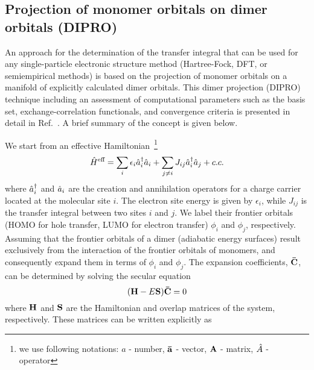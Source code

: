 \subsection{Projection of monomer orbitals on dimer orbitals (DIPRO)}
\label{sec:dipro}
An approach for the determination of the transfer integral that can be used for any single-particle electronic structure method (Hartree-Fock, DFT, or semiempirical methods) is based on the projection of monomer orbitals on a manifold of explicitly calculated dimer orbitals. This dimer projection (DIPRO) technique including an assessment of computational parameters such as the basis set, exchange-correlation functionals, and convergence criteria is presented in detail in Ref.~\cite{baumeier_density-functional_2010}. A brief summary of the concept is given below.

We start from an effective Hamiltonian~\footnote{we use following notations: $a$ - number, $\mathbf{ \bar{a} }$ - vector, $\mathbf{ A }$ - matrix, $\hat{ A }$ - operator}
%
\begin{equation}
  \hat{ H }^\text{eff} = \sum_i \epsilon_i \hat{ a }_i^\dagger \hat{ a }_i + \sum_{j \neq i} J_{ij} \hat{ a }_i^\dagger \hat{ a }_j + c.c.
  \label{equ:dipro_eq1}
\end{equation}
%
where $\hat{ a }_i^\dagger$ and $\hat{ a }_i$ are the creation and annihilation operators for a charge carrier located at the molecular site $i$.
The electron site energy is given by $\epsilon_i$, while $J_{ij}$  is the transfer integral between two sites $i$ and $j$. We label their frontier orbitals (HOMO for hole transfer, LUMO for electron transfer) $\phi_i$ and $\phi_j$, respectively. Assuming that the frontier orbitals of a dimer (adiabatic energy surfaces) result exclusively from the interaction of the frontier orbitals of monomers, and consequently expand them in terms of $\phi_i$ and $\phi_j$. The expansion coefficients, $\mathbf{ \bar{C} }$, can be determined by solving the secular equation
%
\begin{equation}
  (\mathbf{ H } - E \mathbf{ S })\mathbf{ \bar{C} } = 0
  \label{equ:dipro_eq2}
\end{equation}
%
where $\mathbf{ H }$ and $\mathbf{ S }$ are the Hamiltonian and overlap matrices of the system, respectively. 
%
%
%
These matrices can be written explicitly as
